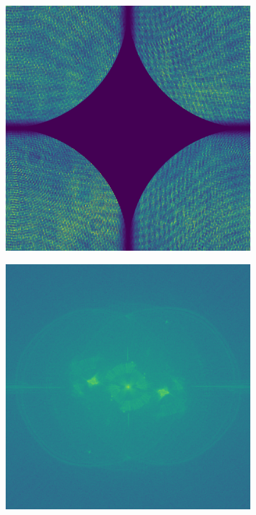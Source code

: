 \begin{figure}
\begin{subfigure}{0.23\textwidth}
		\caption{}
		\label{fig:puw_tukey_window}
	\end{subfigure}
	\begin{subfigure}{0.23\textwidth}
		\centering
		\includegraphics[width=1\linewidth, scale=0.5]{images/puw_fringes_tukey.png}
		\caption{}
		\label{fig:puw_fringes_tukey}
	\end{subfigure}
	\begin{subfigure}{0.23\textwidth}
		\centering
		\includegraphics[width=1\linewidth, scale=0.5]{images/puw_new_fringe_fft.png}
		\caption{}
		\label{fig:puw_new_fringe_fft}
	\end{subfigure}
	

\end{figure}

